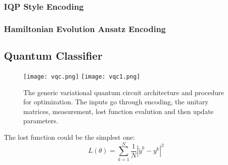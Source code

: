 \subsubsection*{IQP Style Encoding}

\subsubsection*{Hamiltonian Evolution Ansatz Encoding}

\subsection*{Quantum Classifier}

\begin{figure}[h]
  \begin{center}
    \texttt{[image: vqc.png]} 
    \texttt{[image: vqc1.png]} 
  \end{center}
  \caption{The generic variational quantum circuit 
  architecture and procedure for optimization. The 
  inputs go through encoding, the unitary matrices, 
  measurement, lost function evalution and then 
  update parameters.}
\end{figure}

The lost function could be the simplest one: 
\begin{equation}
  L (\theta) = \sum^N_{k=1} \frac{1}{N} |\tilde{y}^k - y^k|^2
\end{equation}

